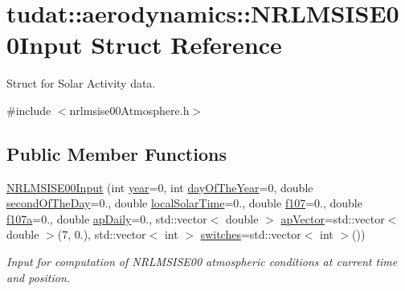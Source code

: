 \hypertarget{structtudat_1_1aerodynamics_1_1NRLMSISE00Input}{}\section{tudat\+:\+:aerodynamics\+:\+:N\+R\+L\+M\+S\+I\+S\+E00\+Input Struct Reference}
\label{structtudat_1_1aerodynamics_1_1NRLMSISE00Input}


Struct for Solar Activity data.  




{\ttfamily \#include $<$nrlmsise00\+Atmosphere.\+h$>$}

\subsection*{Public Member Functions}
\begin{DoxyCompactItemize}
\item 
\hyperlink{structtudat_1_1aerodynamics_1_1NRLMSISE00Input_a9e18207dd9135add620f5e0ead66442d}{N\+R\+L\+M\+S\+I\+S\+E00\+Input} (int \hyperlink{structtudat_1_1aerodynamics_1_1NRLMSISE00Input_a83350bb7163f51646519f9703de0d082}{year}=0, int \hyperlink{structtudat_1_1aerodynamics_1_1NRLMSISE00Input_a58fd8cbf01f7c6db102142bf4eaf5420}{day\+Of\+The\+Year}=0, double \hyperlink{structtudat_1_1aerodynamics_1_1NRLMSISE00Input_abfffa31fb2f519c392d6f4ce38af47f4}{second\+Of\+The\+Day}=0., double \hyperlink{structtudat_1_1aerodynamics_1_1NRLMSISE00Input_ac1591dce12d418721ea177826524c5e7}{local\+Solar\+Time}=0., double \hyperlink{structtudat_1_1aerodynamics_1_1NRLMSISE00Input_aa8acc6d483891e09cc3ac8833ed4f768}{f107}=0., double \hyperlink{structtudat_1_1aerodynamics_1_1NRLMSISE00Input_a4a547d100e582bfcec41b07a1f2a20ed}{f107a}=0., double \hyperlink{structtudat_1_1aerodynamics_1_1NRLMSISE00Input_a3e40e49460a1a234b26d43a45af424ed}{ap\+Daily}=0., std\+::vector$<$ double $>$ \hyperlink{structtudat_1_1aerodynamics_1_1NRLMSISE00Input_a519ac4148a97e930fea9e5a4624f3c1a}{ap\+Vector}=std\+::vector$<$ double $>$(7, 0.), std\+::vector$<$ int $>$ \hyperlink{structtudat_1_1aerodynamics_1_1NRLMSISE00Input_a90237ee7bf069c7a1bf5d0135bd8638d}{switches}=std\+::vector$<$ int $>$())
\begin{DoxyCompactList}\small\item\em Input for computation of N\+R\+L\+M\+S\+I\+S\+E00 atmospheric conditions at current time and position. \end{DoxyCompactList}\end{DoxyCompactItemize}

